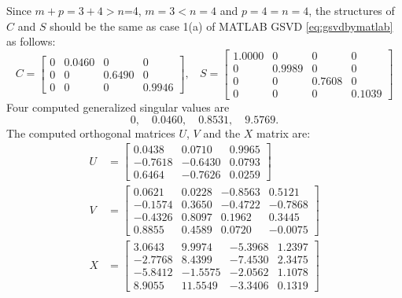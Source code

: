\begin{example}
{\begin{enumerate}[(1).]
Since $m + p  = 3 + 4 > n$=4, $m=3 < n = 4$ and $p=4 = n = 4$, 
the structures of $C$ and $S$ should be the same as case 1(a) of
MATLAB GSVD \eqref{eq:gsvdbymatlab} as follows: 
            \begin{equation*}
                C = \begin{bmatrix}
                     0  &  0.0460  &       0  &       0 \\ 
                     0  &       0  &  0.6490  &       0 \\
                     0  &       0  &       0  &  0.9946
                \end{bmatrix}, \ \ \ \
                S = \begin{bmatrix}
                    1.0000  &       0  &       0  &       0 \\
                         0  &  0.9989  &       0  &       0 \\
                         0  &       0  &  0.7608  &       0 \\
                         0  &       0  &       0  &  0.1039 
                \end{bmatrix}
            \end{equation*}
Four computed generalized singular values are 
\[
0, \quad
0.0460, \quad
0.8531, \quad
9.5769.
\] 
The computed orthogonal matrices $U$, $V$ and the $X$ matrix are:
 \begin{align*}
                U &= \begin{bmatrix}
                    0.0438  &  0.0710  &  0.9965 \\
                   -0.7618  & -0.6430  &  0.0793 \\
                    0.6464  & -0.7626  &  0.0259
                \end{bmatrix} \\
                V &= \begin{bmatrix}
                    0.0621  &  0.0228  & -0.8563 &   0.5121 \\
                   -0.1574  &  0.3650  & -0.4722 &  -0.7868 \\
                   -0.4326  &  0.8097  &  0.1962 &   0.3445 \\
                    0.8855  &  0.4589  &  0.0720 &  -0.0075
                \end{bmatrix} \\
                X &= \begin{bmatrix}
                    3.0643 &   9.9974 &  -5.3968 &  1.2397 \\
                   -2.7768 &   8.4399 &  -7.4530 &  2.3475 \\
                   -5.8412 &  -1.5575 &  -2.0562 &  1.1078 \\
                    8.9055 &  11.5549 &  -3.3406 &  0.1319 
                \end{bmatrix} 
            \end{align*}


\end{enumerate}}
\end{example}

